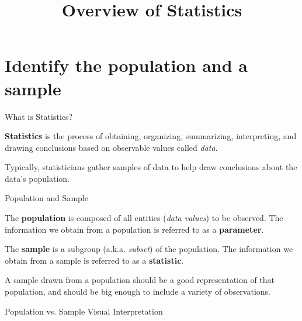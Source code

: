 \documentclass[t]{beamer}
\title{Overview of Statistics}
\author{}
\date{}
\begin{document}
\begin{frame} 
\maketitle
\end{frame}

\section{Identify the population and a sample}

\begin{frame}{What is Statistics?}
\begin{tcolorbox}[colframe=green!20!black, colback = green!30!white,title=\textbf{Statistics}]
\textbf{Statistics} is the process of obtaining, organizing, summarizing, interpreting, and drawing conclusions based on observable values called \textit{data}.
\end{tcolorbox}
\vspace{10pt}	\pause

Typically, statisticians gather samples of data to help draw conclusions about the data's population.
\end{frame}

\begin{frame}{Population and Sample}
\begin{tcolorbox}[colframe=green!20!black, colback = green!30!white,title=\textbf{Population}]
The \textbf{population} is composed of all entities (\textit{data values}) to be observed. The information we obtain from a population is referred to as a \textbf{parameter}.
\end{tcolorbox}
\vspace{6pt}	\pause
\begin{tcolorbox}[colframe=green!20!black, colback = green!30!white,title=\textbf{Sample}]
The \textbf{sample} is a subgroup (a.k.a. \textit{subset}) of the population. The information we obtain from a sample is referred to as a \textbf{statistic}.
\end{tcolorbox}
\vspace{6pt}	\pause
A sample drawn from a population should be a good representation of that population, and should be big enough to include a variety of observations.
\end{frame}

\begin{frame}{Population vs. Sample Visual Interpretation}
\begin{center}
\end{center}
\end{frame}
\end{document}
